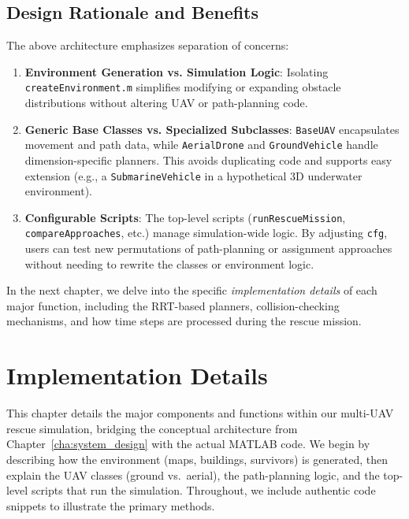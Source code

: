 \documentclass[12pt,a4paper]{report}
\begin{document}
\section{Design Rationale and Benefits}
\label{sec:design_rationale}
The above architecture emphasizes separation of concerns:

\begin{enumerate}
    \item \textbf{Environment Generation vs. Simulation Logic}: 
          Isolating \texttt{createEnvironment.m} simplifies modifying or expanding 
          obstacle distributions without altering UAV or path-planning code.
    \item \textbf{Generic Base Classes vs. Specialized Subclasses}: 
          \texttt{BaseUAV} encapsulates movement and path data, while \texttt{AerialDrone} 
          and \texttt{GroundVehicle} handle dimension-specific planners. This avoids 
          duplicating code and supports easy extension (e.g., a \texttt{SubmarineVehicle} 
          in a hypothetical 3D underwater environment).
    \item \textbf{Configurable Scripts}: 
          The top-level scripts (\texttt{runRescueMission}, \texttt{compareApproaches}, 
          etc.) manage simulation-wide logic. By adjusting \texttt{cfg}, users can test 
          new permutations of path-planning or assignment approaches without needing 
          to rewrite the classes or environment logic.
\end{enumerate}

\noindent 
In the next chapter, we delve into the specific \emph{implementation details} of each major 
function, including the RRT-based planners, collision-checking mechanisms, and how time steps 
are processed during the rescue mission.

\chapter{Implementation Details}
\label{cha:implementation}

This chapter details the major components and functions within our multi-UAV rescue 
simulation, bridging the conceptual architecture from Chapter~\ref{cha:system_design} 
with the actual MATLAB code. We begin by describing how the environment (maps, buildings, 
survivors) is generated, then explain the UAV classes (ground vs.\ aerial), the path-planning 
logic, and the top-level scripts that run the simulation. Throughout, we include 
authentic code snippets to illustrate the primary methods.
\end{document}
